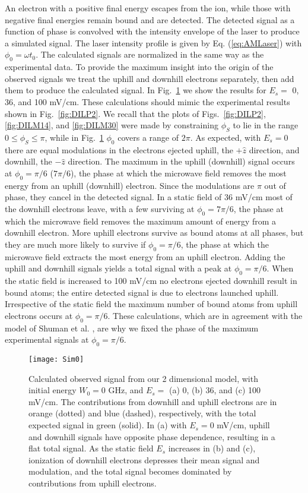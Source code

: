 \documentclass[aps,pra,reprint,groupedaddress]{revtex4-1}
\begin{document}
An electron with a positive final energy escapes from the ion, while those with negative final energies remain bound and are detected. The detected signal as a function of phase is convolved with the intensity envelope of the laser to produce a simulated signal. The laser intensity profile is given by Eq. (\ref{eq:AMLaser}) with $\phi_0=\omega t_0$. The calculated signals are normalized in the same way as the experimental data. To provide the maximum insight into the origin of the observed signals we treat the uphill and downhill electrons separately, then add them to produce the calculated signal.
In Fig.~\ref{fig:2DW0} we show the results for $E_s =$ 0, 36, and 100 mV/cm. These calculations should mimic the experimental results shown in Fig.~\ref{fig:DILP2}. We recall that the plots of Figs.~\ref{fig:DILP2}, \ref{fig:DILM14}, and \ref{fig:DILM30} were made by constraining $\phi_S$ to lie in the range $0 \leq \phi_S \leq \pi$, while in Fig.~\ref{fig:2DW0} $\phi_0$ covers a range of $2\pi$. As expected, with $E_s=0$ there are equal modulations in the electrons ejected uphill, the $+\hat{z}$ direction, and downhill, the $-\hat{z}$ direction. The maximum in the uphill (downhill) signal occurs at $\phi_0=\pi/6$ ($7\pi/6$), the phase at which the microwave field removes the most energy from an uphill (downhill) electron. Since the modulations are $\pi$ out of phase, they cancel in the detected signal. In a static field of 36 mV/cm most of the downhill electrons leave, with a few surviving at $\phi_0=7\pi/6$, the phase at which the microwave field removes the maximum amount of energy from a downhill electron. More uphill electrons survive as bound atoms at all phases, but they are much more likely to survive if $\phi_0=\pi/6$, the phase at which the microwave field extracts the most energy from an uphill electron. Adding the uphill and downhill signals yields a total signal with a peak at $\phi_0=\pi/6$. When the static field is increased to 100 mV/cm no electrons ejected downhill result in bound atoms; the entire detected signal is due to electrons launched uphill. Irrespective of the static field the maximum number of bound atoms from uphill electrons occurs at $\phi_0=\pi/6$. These calculations, which are in agreement with the model of Shuman et al. \cite{Shuman}, are why we fixed the phase of the maximum experimental signals at $\phi_0=\pi/6$.

\begin{figure}
	\texttt{[image: Sim0]}
	\caption{Calculated observed signal from our 2 dimensional model, with initial energy $W_0 = 0$ GHz, and $E_s =$ (a) 0, (b) 36, and (c) 100 mV/cm. The contributions from downhill and uphill electrons are in orange (dotted) and blue (dashed), respectively, with the total expected signal in green (solid). In (a) with $E_s = 0$ mV/cm, uphill and downhill signals have opposite phase dependence, resulting in a flat total signal. As the static field $E_s$ increases in (b) and (c), ionization of downhill electrons depresses their mean signal and modulation, and the total signal becomes dominated by contributions from uphill electrons.}
	\label{fig:2DW0}
\end{figure}
\end{document}
